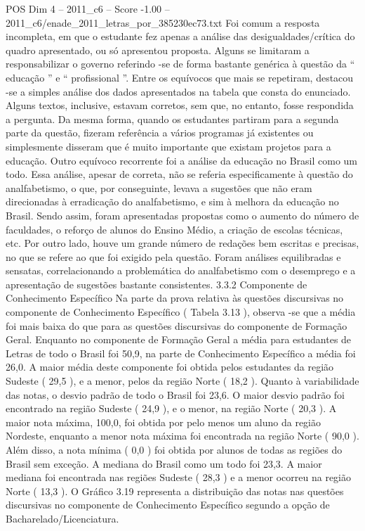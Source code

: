 \begin{textsample}{POS Dim 4 – 2011\_c6 – Score -1.00 – 2011\_c6/enade\_2011\_letras\_por\_385230ec73.txt}
Foi comum a resposta incompleta, em que o estudante fez apenas a análise das desigualdades/crítica do quadro apresentado, ou só apresentou proposta.
Alguns se limitaram a responsabilizar o governo referindo -se de forma bastante genérica à questão da “ educação ” e “ profissional ”.
Entre os equívocos que mais se repetiram, destacou -se a simples análise dos dados apresentados na tabela que consta do enunciado.
Alguns textos, inclusive, estavam corretos, sem que, no entanto, fosse respondida a pergunta.
Da mesma forma, quando os estudantes partiram para a segunda parte da questão, fizeram referência a vários programas já existentes ou simplesmente disseram que é muito importante que existam projetos para a educação.
Outro equívoco recorrente foi a análise da educação no Brasil como um todo.
Essa análise, apesar de correta, não se referia especificamente à questão do analfabetismo, o que, por conseguinte, levava a sugestões que não eram direcionadas à erradicação do analfabetismo, e sim à melhora da educação no Brasil.
Sendo assim, foram apresentadas propostas como o aumento do número de faculdades, o reforço de alunos do Ensino Médio, a criação de escolas técnicas, etc.
Por outro lado, houve um grande número de redações bem escritas e precisas, no que se refere ao que foi exigido pela questão.
Foram análises equilibradas e sensatas, correlacionando a problemática do analfabetismo com o desemprego e a apresentação de sugestões bastante consistentes. 3.3.2 Componente de Conhecimento Específico Na parte da prova relativa às questões discursivas no componente de Conhecimento Específico ( Tabela 3.13 ), observa -se que a média foi mais baixa do que para as questões discursivas do componente de Formação Geral.
Enquanto no componente de Formação Geral a média para estudantes de Letras de todo o Brasil foi 50,9, na parte de Conhecimento Específico a média foi 26,0.
A maior média deste componente foi obtida pelos estudantes da região Sudeste ( 29,5 ), e a menor, pelos da região Norte ( 18,2 ).
Quanto à variabilidade das notas, o desvio padrão de todo o Brasil foi 23,6.
O maior desvio padrão foi encontrado na região Sudeste ( 24,9 ), e o menor, na região Norte ( 20,3 ).
A maior nota máxima, 100,0, foi obtida por pelo menos um aluno da região Nordeste, enquanto a menor nota máxima foi encontrada na região Norte ( 90,0 ).
Além disso, a nota mínima ( 0,0 ) foi obtida por alunos de todas as regiões do Brasil sem exceção.
A mediana do Brasil como um todo foi 23,3.
A maior mediana foi encontrada nas regiões Sudeste ( 28,3 ) e a menor ocorreu na região Norte ( 13,3 ).
O Gráfico 3.19 representa a distribuição das notas nas questões discursivas no componente de Conhecimento Específico segundo a opção de Bacharelado/Licenciatura.

\end{textsample}

